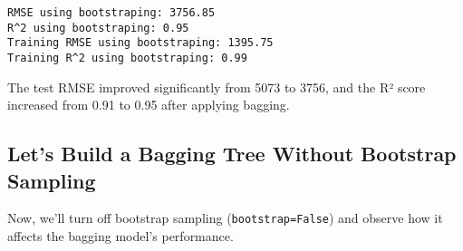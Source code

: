 \documentclass[
  letterpaper,
  DIV=11,
  numbers=noendperiod]{scrreprt}
\begin{document}
\begin{verbatim}
RMSE using bootstraping: 3756.85
R^2 using bootstraping: 0.95
Training RMSE using bootstraping: 1395.75
Training R^2 using bootstraping: 0.99
\end{verbatim}

The test RMSE improved significantly from 5073 to 3756, and the R² score
increased from 0.91 to 0.95 after applying bagging.

\subsection{Let's Build a Bagging Tree Without Bootstrap
Sampling}\label{lets-build-a-bagging-tree-without-bootstrap-sampling}

Now, we'll turn off bootstrap sampling (\texttt{bootstrap=False}) and
observe how it affects the bagging model's performance.
\end{document}

